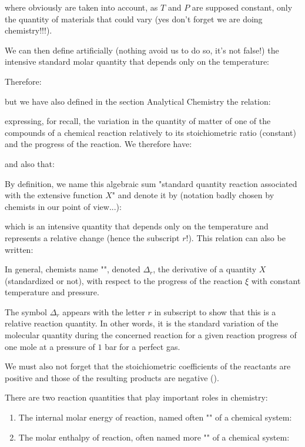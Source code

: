 	where obviously are taken into account, as $T$ and $P$ are supposed constant, only the quantity of materials that could vary (yes don't forget we are doing chemistry!!!).

	We can then define artificially (nothing avoid us to do so, it's not false!) the intensive standard molar quantity that depends only on the temperature:
	
	Therefore:
	
	but we have also defined in the section Analytical Chemistry the relation:
	
	expressing, for recall, the variation in the quantity of matter of one of the compounds of a chemical reaction relatively to its stoichiometric ratio (constant) and the progress of the reaction. We therefore have:
	
	and also that:
	
	By definition, we name this algebraic sum "standard quantity reaction associated with the extensive function $X$" and denote it by (notation badly chosen by chemists in our point of view...):
	
	which is an intensive quantity that depends only on the temperature and represents a relative change (hence the subscript $r$!). This relation can also be written:
	
	In general, chemists name "", denoted $\Delta_r$, the derivative of a quantity $X$ (standardized or not), with respect to the progress of the reaction $\xi$ with constant temperature and pressure.
	\begin{tcolorbox}[title=Remark,colframe=black,arc=10pt]
	The symbol $\Delta_r$ appears with the letter $r$ in subscript to show that this is a relative reaction quantity. In other words, it is the standard variation of the molecular quantity during the concerned reaction for a given reaction progress of one mole at a pressure of $1$ bar for a perfect gas.
	\end{tcolorbox}
	We must also not forget that the stoichiometric coefficients of the reactants are positive and those of the resulting products are negative ().

	There are two reaction quantities that play important roles in chemistry:
	\begin{enumerate}
		\item The internal molar energy of reaction, named often "" of a chemical system:
		

		\item The molar enthalpy of reaction, often named more "" of a chemical system:
		
	\end{enumerate}
	
